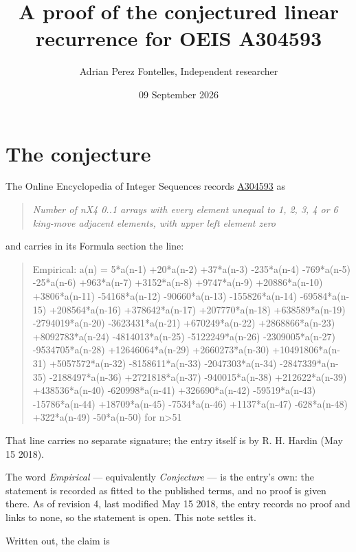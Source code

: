 \documentclass[11pt]{article}
\title{A proof of the conjectured linear recurrence for OEIS A304593}
\author{Adrian Perez Fontelles, Independent researcher}
\date{09 September 2026}
\theoremstyle{definition}
\begin{document}
\maketitle
\section{The conjecture}

The Online Encyclopedia of Integer Sequences records \href{https://oeis.org/A304593}{A304593} as

\begin{quote}\itshape Number of nX4 0..1 arrays with every element unequal to 1, 2, 3, 4 or 6 king-move adjacent elements, with upper left element zero\end{quote}

and carries in its Formula section the line:

\begin{quote}\ttfamily Empirical: a(n) = 5*a(n-1) +20*a(n-2) +37*a(n-3) -235*a(n-4) -769*a(n-5) -25*a(n-6) +963*a(n-7) +3152*a(n-8) +9747*a(n-9) +20886*a(n-10) +3806*a(n-11) -54168*a(n-12) -90660*a(n-13) -155826*a(n-14) -69584*a(n-15) +208564*a(n-16) +378642*a(n-17) +207770*a(n-18) +638589*a(n-19) -2794019*a(n-20) -3623431*a(n-21) +670249*a(n-22) +2868866*a(n-23) +8092783*a(n-24) -4814013*a(n-25) -5122249*a(n-26) -2309005*a(n-27) -9534705*a(n-28) +12646064*a(n-29) +2660273*a(n-30) +10491806*a(n-31) +5057572*a(n-32) -8158611*a(n-33) -2047303*a(n-34) -2847339*a(n-35) -2188497*a(n-36) +2721818*a(n-37) -940015*a(n-38) +212622*a(n-39) +438536*a(n-40) -620998*a(n-41) +326690*a(n-42) -59519*a(n-43) -15786*a(n-44) +18709*a(n-45) -7534*a(n-46) +1137*a(n-47) -628*a(n-48) +322*a(n-49) -50*a(n-50) for n>51\end{quote}

That line carries no separate signature; the entry itself is by R. H. Hardin (May 15 2018).

The word {\itshape Empirical} --- equivalently {\itshape Conjecture} --- is the entry's own: the statement is recorded as fitted to the published terms, and no proof is given there. As of revision 4, last modified May 15 2018, the entry records no proof and links to none, so the statement is open. This note settles it.

Written out, the claim is
\end{document}
